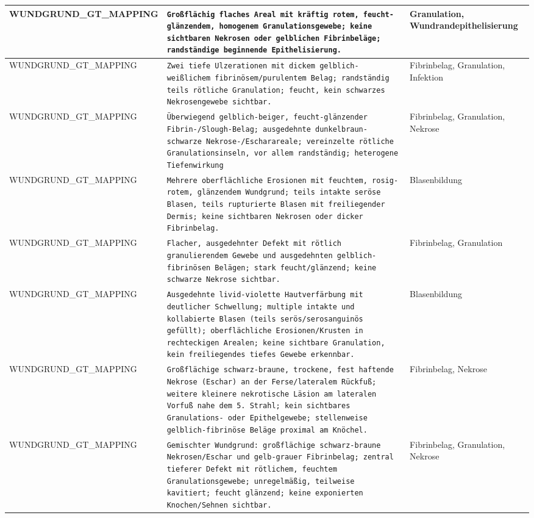 \begin{longtable}{|p{3.5cm}|p{5cm}|p{6.5cm}|}
WUNDGRUND\_GT\_MAPPING & \texttt{Großflächig flaches Areal mit kräftig rotem, feucht-glänzendem, homogenem Granulationsgewebe; keine sichtbaren Nekrosen oder gelblichen Fibrinbeläge; randständige beginnende Epithelisierung.} & Granulation, Wundrandepithelisierung \\ \hline
WUNDGRUND\_GT\_MAPPING & \texttt{Zwei tiefe Ulzerationen mit dickem gelblich-weißlichem fibrinösem/purulentem Belag; randständig teils rötliche Granulation; feucht, kein schwarzes Nekrosengewebe sichtbar.} & Fibrinbelag, Granulation, Infektion \\ \hline
WUNDGRUND\_GT\_MAPPING & \texttt{Überwiegend gelblich-beiger, feucht-glänzender Fibrin-/Slough-Belag; ausgedehnte dunkelbraun-schwarze Nekrose-/Escharareale; vereinzelte rötliche Granulationsinseln, vor allem randständig; heterogene Tiefenwirkung} & Fibrinbelag, Granulation, Nekrose \\ \hline
WUNDGRUND\_GT\_MAPPING & \texttt{Mehrere oberflächliche Erosionen mit feuchtem, rosig-rotem, glänzendem Wundgrund; teils intakte seröse Blasen, teils rupturierte Blasen mit freiliegender Dermis; keine sichtbaren Nekrosen oder dicker Fibrinbelag.} & Blasenbildung \\ \hline
WUNDGRUND\_GT\_MAPPING & \texttt{Flacher, ausgedehnter Defekt mit rötlich granulierendem Gewebe und ausgedehnten gelblich-fibrinösen Belägen; stark feucht/glänzend; keine schwarze Nekrose sichtbar.} & Fibrinbelag, Granulation \\ \hline
WUNDGRUND\_GT\_MAPPING & \texttt{Ausgedehnte livid‑violette Hautverfärbung mit deutlicher Schwellung; multiple intakte und kollabierte Blasen (teils serös/serosanguinös gefüllt); oberflächliche Erosionen/Krusten in rechteckigen Arealen; keine sichtbare Granulation, kein freiliegendes tiefes Gewebe erkennbar.} & Blasenbildung \\ \hline
WUNDGRUND\_GT\_MAPPING & \texttt{Großflächige schwarz-braune, trockene, fest haftende Nekrose (Eschar) an der Ferse/lateralem Rückfuß; weitere kleinere nekrotische Läsion am lateralen Vorfuß nahe dem 5. Strahl; kein sichtbares Granulations- oder Epithelgewebe; stellenweise gelblich-fibrinöse Beläge proximal am Knöchel.} & Fibrinbelag, Nekrose \\ \hline
WUNDGRUND\_GT\_MAPPING & \texttt{Gemischter Wundgrund: großflächige schwarz-braune Nekrosen/Eschar und gelb-grauer Fibrinbelag; zentral tieferer Defekt mit rötlichem, feuchtem Granulationsgewebe; unregelmäßig, teilweise kavitiert; feucht glänzend; keine exponierten Knochen/Sehnen sichtbar.} & Fibrinbelag, Granulation, Nekrose \\ \hline

\end{longtable}
